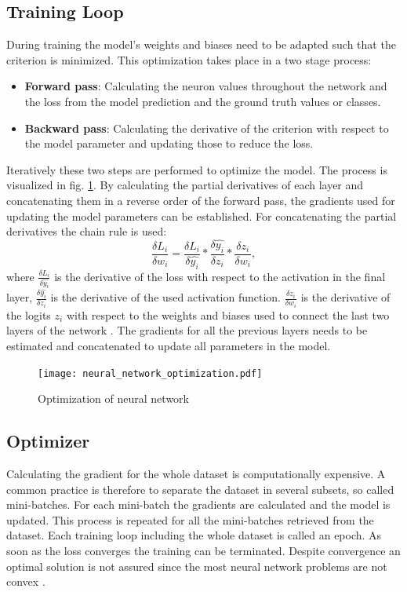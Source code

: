 \subsection{Training Loop}
During training the model's weights and biases need to be adapted such that the criterion is minimized. This optimization takes place in a two stage process:
\begin{itemize}
    \item \textbf{Forward pass}: Calculating the neuron values throughout the network and the loss from the model prediction and the ground truth values or classes.
    \item \textbf{Backward pass}: Calculating the derivative of the criterion with respect to the model parameter and updating those to reduce the loss.
\end{itemize}
Iteratively these two steps are performed to optimize the model. The process is visualized in fig. \ref{fig:neural_network_optimization}. By calculating the partial derivatives of each layer and concatenating them in a reverse order of the forward pass, the gradients used for updating the model parameters can be established. For concatenating the partial derivatives the chain rule is used:
\begin{equation}
 \frac{\delta L_{i}}{\delta w_{i}} = \frac{\delta L_{i}}{\delta \hat{y_{i}}} * \frac{\delta \hat{y_{i}}}{\delta z_{i}} * \frac{\delta z_{i}}{\delta w_{i}}, 
 \label{chain_rule}
\end{equation}
where $\frac{\delta L_{i}}{\delta \hat{y_{i}}}$ is the derivative of the loss with respect to the activation in the final layer, $\frac{\delta \hat{y_{i}}}{\delta z_{i}}$ is the derivative of the used activation function.  $\frac{\delta z_{i}}{\delta w_{i}}$ is the derivative of the logits $z_{i}$ with respect to the weights and biases used to connect the last two layers of the network \cite{ShilohPerl2020}. The gradients for all the previous layers needs to be estimated and concatenated to update all parameters in the model.

\begin{figure}[H]
  \centering
  \texttt{[image: neural\_network\_optimization.pdf]}
  \caption {Optimization of neural network}
  \label{fig:neural_network_optimization}
\end{figure}

\subsection{Optimizer}
Calculating the gradient for the whole dataset is computationally expensive. A common practice is therefore to separate the dataset in several subsets, so called mini-batches. For each mini-batch the gradients are calculated and the model is updated. This process is repeated for all the mini-batches retrieved from the dataset. Each training loop including the whole dataset is called an epoch. As soon as the loss converges the training can be terminated. Despite convergence an optimal solution is not assured since the most neural network problems are not convex \cite{ShilohPerl2020}.

